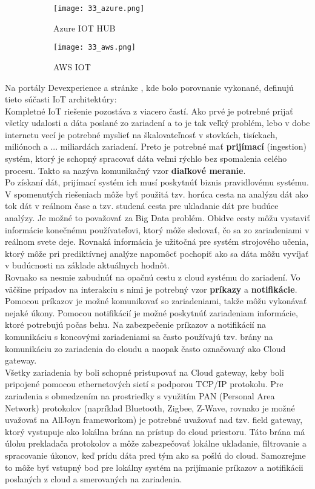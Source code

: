 \begin{figure}[h]
\centering
\begin{subfigure}[b]{0.8\textwidth}
\texttt{[image: 33\_azure.png]}
\caption{Azure IOT HUB \cite{IOT22}}
\label{33_azure}
\end{subfigure}
\begin{subfigure}[b]{0.8\textwidth}
\texttt{[image: 33\_aws.png]}
\caption{AWS IOT \cite{IOT22}}
\label{33_aws}
\end{subfigure}
\caption{}
\label{33_aa}
\end{figure}
\indent Na portály Devexperience a stránke \cite{IOT22}, kde bolo porovnanie vykonané, definujú tieto súčasti IoT architektúry: \\
\indent Kompletné IoT riešenie pozostáva z viacero častí. Ako prvé je potrebné prijať všetky udalosti a dáta poslané zo zariadení a to je tak veľký problém, lebo v dobe internetu vecí je potrebné myslieť na škalovateľnosť v stovkách, tisíckach, miliónoch a ...  miliardách zariadení. Preto je potrebné mať \textbf{prijímací} (ingestion) systém, ktorý je schopný spracovať dáta veľmi rýchlo bez spomalenia celého procesu. Takto sa nazýva komunikačný vzor\textbf{ diaľkové meranie}. \\
\indent Po získaní dát, prijímací systém ich musí poskytnúť biznis pravidlovému systému. V spomenutých riešeniach môže byť použitá tzv. horúca cesta na analýzu dát ako tok dát v reálnom čase a tzv. studená cesta pre ukladanie dát pre budúce analýzy. Je možné to považovať za Big Data problém. Obidve cesty môžu vystaviť informácie konečnému používateľovi, ktorý môže sledovať, čo sa zo zariadeniami v reálnom svete deje. Rovnaká informácia je  užitočná pre systém strojového učenia, ktorý môže pri prediktívnej analýze napomôcť pochopiť ako sa dáta môžu vyvíjať v budúcnosti na základe aktuálnych hodnôt. \\
\indent Rovnako sa nesmie zabudnúť na opačnú cestu z cloud systému do zariadení. Vo väčšine prípadov na interakciu s nimi je potrebný vzor \textbf{príkazy} a \textbf{notifikácie}. Pomocou príkazov je možné komunikovať so zariadeniami, takže môžu vykonávať nejaké úkony. Pomocou notifikácií je možné poskytnúť zariadeniam informácie, ktoré potrebujú počas behu. Na zabezpečenie príkazov a notifikácií na komunikáciu s koncovými zariadeniami sa často používajú tzv. brány na komunikáciu zo zariadenia do cloudu a naopak často označovaný ako Cloud gateway. \\
\indent Všetky zariadenia by boli schopné pristupovať na Cloud gateway, keby boli pripojené pomocou ethernetových sietí s podporou TCP/IP protokolu. Pre zariadenia s obmedzením na prostriedky s využitím PAN (Personal Area Network) protokolov (napríklad Bluetooth, Zigbee, Z-Wave, rovnako je možné uvažovať na AllJoyn frameworkom) je potrebné uvažovať nad tzv. field gateway, ktorý vystupuje ako lokálna brána na prístup do cloud priestoru. Táto brána má úlohu prekladača protokolov a môže zabezpečovať lokálne ukladanie, filtrovanie a spracovanie úkonov, keď prídu dáta pred tým ako sa pošlú do cloud. Samozrejme to môže byť vstupný bod pre lokálny systém na prijímanie príkazov a notifikácii poslaných z cloud a smerovaných na zariadenia. \cite{IOT22}
